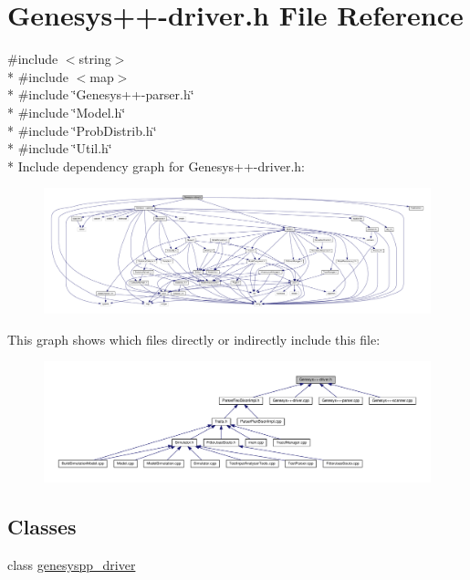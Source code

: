 \hypertarget{_genesys_09_09-driver_8h}{\section{Genesys++-\/driver.h File Reference}
\label{_genesys_09_09-driver_8h}
}
{\ttfamily \#include $<$string$>$}\\*
{\ttfamily \#include $<$map$>$}\\*
{\ttfamily \#include \char`\"{}Genesys++-\/parser.\-h\char`\"{}}\\*
{\ttfamily \#include \char`\"{}Model.\-h\char`\"{}}\\*
{\ttfamily \#include \char`\"{}Prob\-Distrib.\-h\char`\"{}}\\*
{\ttfamily \#include \char`\"{}Util.\-h\char`\"{}}\\*
Include dependency graph for Genesys++-\/driver.h\-:
\nopagebreak
\begin{figure}[H]
\begin{center}
\leavevmode
\includegraphics[width=350pt]{_genesys_09_09-driver_8h__incl}
\end{center}
\end{figure}
This graph shows which files directly or indirectly include this file\-:
\nopagebreak
\begin{figure}[H]
\begin{center}
\leavevmode
\includegraphics[width=350pt]{_genesys_09_09-driver_8h__dep__incl}
\end{center}
\end{figure}
\subsection*{Classes}
\begin{DoxyCompactItemize}
\item 
class \hyperlink{classgenesyspp__driver}{genesyspp\-\_\-driver}
\end{DoxyCompactItemize}
